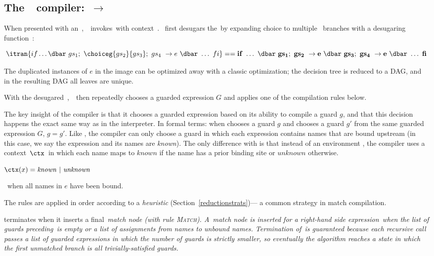\documentclass[runningheads]{llncs}
\begin{document}
    \subsection{The~\DTran\ compiler:~\VMinus $\rightarrow$~\D}


    When presented with an~\iffibf,~\DTran~invokes~\Compile with context~\ctx. %
    \Compile~first desugars the~\iffibf by expanding choice to multiple~\iffibf
    branches with a desugaring function~\ITran: 
    
    {\scriptsize \[
      \itran{if\dots \dbar~gs_{1};~\choiceg{gs_{2}}{gs_{3}};~gs_{4}~\rightarrow e~\dbar~\dots~fi}
      ==
      {\bf{if}~\dots~\dbar~gs_{1};~gs_{2}~\rightarrow e~\dbar~gs_{3};~gs_{4}~\rightarrow e~\dbar~\dots~\bf{fi}}
    \]}

    The duplicated instances of $e$ in the image can be optimized away with a
    classic optimization;
    the decision tree is reduced to a DAG, and in the resulting DAG all
    leaves are unique. 

    With the desugared~\iffibf,~\Compile\ then repeatedly chooses a guarded
    expression $G$ and applies one of the compilation rules below. %

    The key insight of the compiler is that it chooses a guarded expression
    based on its ability to compile a guard $g$, and that this decision happens
    the exact same way as in the \VMinus interpreter. %
    In formal terms: when \VMinus chooses a guard $g$ and \DTran chooses a guard
    $g'$ from the same guarded expression $G$, $g = g'$. %
    Like \VMinus, the compiler can only choose a guard in which each expression
    contains names that are bound upstream (in this case, we say the expression
    and its names are \textit{known}). The only difference with \VMinus is that
    instead of an environment \Rho, the compiler uses a context~$\ctx$~in which
    each name maps to $known$ if the name has a prior binding site or $unknown$
    otherwise. 
    
    $\ctx(x) = \mathit{known~|~unknown}$
    
    \knownj~when all names in $e$ have been bound. 
  
    The rules are applied in order according to a \textit{heuristic}
    (Section~\ref{reductionstrats})--- a common strategy in match compilation. 

    \Compile terminates when it inserts a final~\it{match} node (with rule
    \textsc{Match}). %
    A~\it{match} node is inserted for a right-hand side expression~\expr when the
    list of guards preceding~\expr is empty or a list of assignments from names
    to unbound names. %
    Termination of~\DTran\~is guaranteed because each recursive call passes a
    list of guarded expressions in which the number of guards is strictly
    smaller, so eventually the algorithm reaches a state in which the first
    unmatched branch is all trivially-satisfied guards. %
\end{document}
